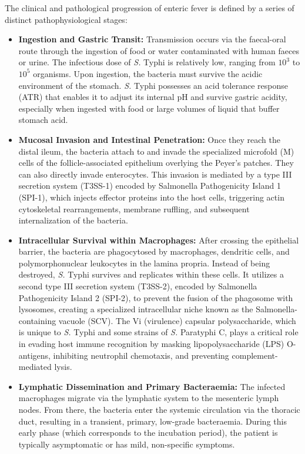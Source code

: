 The clinical and pathological progression of enteric fever is defined by a series of distinct pathophysiological stages:
\begin{itemize}
\item \textbf{Ingestion and Gastric Transit:} Transmission occurs via the faecal-oral route through the ingestion of food or water contaminated with human faeces or urine. The infectious dose of \textit{S.} Typhi is relatively low, ranging from $10^3$ to $10^5$ organisms. Upon ingestion, the bacteria must survive the acidic environment of the stomach. \textit{S.} Typhi possesses an acid tolerance response (ATR) that enables it to adjust its internal pH and survive gastric acidity, especially when ingested with food or large volumes of liquid that buffer stomach acid.
\item \textbf{Mucosal Invasion and Intestinal Penetration:} Once they reach the distal ileum, the bacteria attach to and invade the specialized microfold (M) cells of the follicle-associated epithelium overlying the Peyer's patches. They can also directly invade enterocytes. This invasion is mediated by a type III secretion system (T3SS-1) encoded by Salmonella Pathogenicity Island 1 (SPI-1), which injects effector proteins into the host cells, triggering actin cytoskeletal rearrangements, membrane ruffling, and subsequent internalization of the bacteria.
\item \textbf{Intracellular Survival within Macrophages:} After crossing the epithelial barrier, the bacteria are phagocytosed by macrophages, dendritic cells, and polymorphonuclear leukocytes in the lamina propria. Instead of being destroyed, \textit{S.} Typhi survives and replicates within these cells. It utilizes a second type III secretion system (T3SS-2), encoded by Salmonella Pathogenicity Island 2 (SPI-2), to prevent the fusion of the phagosome with lysosomes, creating a specialized intracellular niche known as the Salmonella-containing vacuole (SCV). The Vi (virulence) capsular polysaccharide, which is unique to \textit{S.} Typhi and some strains of \textit{S.} Paratyphi C, plays a critical role in evading host immune recognition by masking lipopolysaccharide (LPS) O-antigens, inhibiting neutrophil chemotaxis, and preventing complement-mediated lysis.
\item \textbf{Lymphatic Dissemination and Primary Bacteraemia:} The infected macrophages migrate via the lymphatic system to the mesenteric lymph nodes. From there, the bacteria enter the systemic circulation via the thoracic duct, resulting in a transient, primary, low-grade bacteraemia. During this early phase (which corresponds to the incubation period), the patient is typically asymptomatic or has mild, non-specific symptoms.

\end{itemize}

